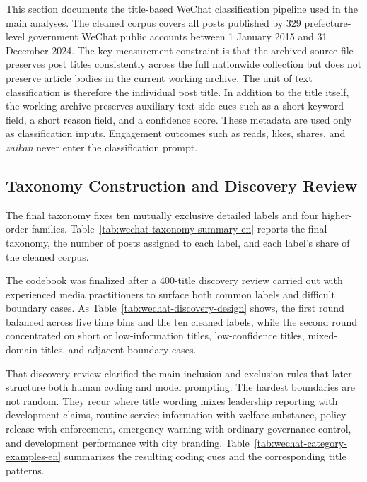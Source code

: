 \documentclass[12pt, american]{article}
\begin{document}
This section documents the title-based WeChat classification pipeline used in the main analyses. The cleaned corpus covers all posts published by 329 prefecture-level government WeChat public accounts between 1 January 2015 and 31 December 2024. The key measurement constraint is that the archived source file preserves post titles consistently across the full nationwide collection but does not preserve article bodies in the current working archive. The unit of text classification is therefore the individual post title. In addition to the title itself, the working archive preserves auxiliary text-side cues such as a short keyword field, a short reason field, and a confidence score. These metadata are used only as classification inputs. Engagement outcomes such as reads, likes, shares, and \textit{zaikan} never enter the classification prompt.

\subsection{Taxonomy Construction and Discovery Review \label{app:wechat-discovery}}

The final taxonomy fixes ten mutually exclusive detailed labels and four higher-order families. Table~\ref{tab:wechat-taxonomy-summary-en} reports the final taxonomy, the number of posts assigned to each label, and each label's share of the cleaned corpus.



The codebook was finalized after a 400-title discovery review carried out with experienced media practitioners to surface both common labels and difficult boundary cases. As Table~\ref{tab:wechat-discovery-design} shows, the first round balanced across five time bins and the ten cleaned labels, while the second round concentrated on short or low-information titles, low-confidence titles, mixed-domain titles, and adjacent boundary cases.



That discovery review clarified the main inclusion and exclusion rules that later structure both human coding and model prompting. The hardest boundaries are not random. They recur where title wording mixes leadership reporting with development claims, routine service information with welfare substance, policy release with enforcement, emergency warning with ordinary governance control, and development performance with city branding. Table~\ref{tab:wechat-category-examples-en} summarizes the resulting coding cues and the corresponding title patterns.
\end{document}
